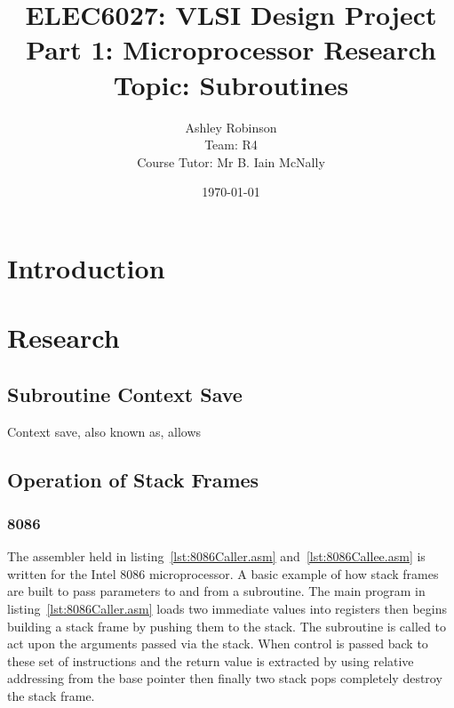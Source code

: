 \documentclass[12pt,a4paper]{article}
\title{ELEC6027: VLSI Design Project \\Part 1: Microprocessor Research\\Topic: Subroutines}
\author{Ashley Robinson\\ Team: R4\\Course Tutor: Mr B. Iain McNally}
\date{\today}
\begin{document}
\begin{titlepage}
\maketitle
\end{titlepage}

\tableofcontents
\clearpage

\lstset{
    basicstyle=\footnotesize,        %
   captionpos=b   
}


\section{Introduction}


\section{Research}

\subsection{Subroutine Context Save }
Context save, also known as, allows 
\subsection{Operation of Stack Frames}


\newpage
\subsubsection{8086}
The assembler held in listing~\ref{lst:8086Caller.asm} and~\ref{lst:8086Callee.asm} is written for the Intel 8086 microprocessor.
A basic example of how stack frames are built to pass parameters to and from a subroutine.
The main program in listing~\ref{lst:8086Caller.asm} loads two immediate values into registers then begins building a stack frame by pushing them to the stack.  
The subroutine is called to act upon the arguments passed via the stack.
When control is passed back to these set of instructions and the return value is extracted by using relative addressing from the base pointer then finally two stack pops completely destroy the stack frame.


\end{document}
